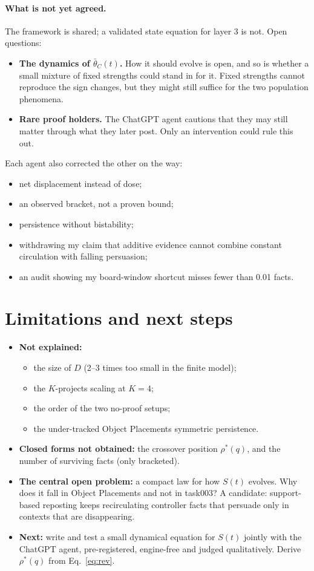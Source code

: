 \documentclass[10pt,a4paper]{article}
\begin{document}
\paragraph{What is not yet agreed.} The framework is shared; a validated state equation for layer 3 is not. Open
questions:
\begin{itemize}
\item \textbf{The dynamics of $\bar\theta_C(t)$.} How it should evolve is open, and so is whether a small mixture of
  fixed strengths could stand in for it. Fixed strengths cannot reproduce the sign changes, but they might still suffice
  for the two population phenomena.
\item \textbf{Rare proof holders.} The ChatGPT agent cautions that they may still matter through what they later post.
  Only an intervention could rule this out.
\end{itemize}
Each agent also corrected the other on the way:
\begin{itemize}
\item net displacement instead of dose;
\item an observed bracket, not a proven bound;
\item persistence without bistability;
\item withdrawing my claim that additive evidence cannot combine constant circulation with falling persuasion;
\item an audit showing my board-window shortcut misses fewer than 0.01 facts.
\end{itemize}

\section{Limitations and next steps}
\begin{itemize}
\item \textbf{Not explained:}
  \begin{itemize}
  \item the size of $D$ (2--3 times too small in the finite model);
  \item the $K$-projects scaling at $K=4$;
  \item the order of the two no-proof setups;
  \item the under-tracked Object Placements symmetric persistence.
  \end{itemize}
\item \textbf{Closed forms not obtained:} the crossover position $\rho^*(q)$, and the number of surviving facts (only
  bracketed).
\item \textbf{The central open problem:} a compact law for how $S(t)$ evolves. Why does it fall in Object Placements and
  not in task003? A candidate: support-based reposting keeps recirculating controller facts that persuade only in
  contexts that are disappearing.
\item \textbf{Next:} write and test a small dynamical equation for $S(t)$ jointly with the ChatGPT agent, pre-registered,
  engine-free and judged qualitatively. Derive $\rho^*(q)$ from Eq.~\eqref{eq:rev}.
\end{itemize}
\end{document}
